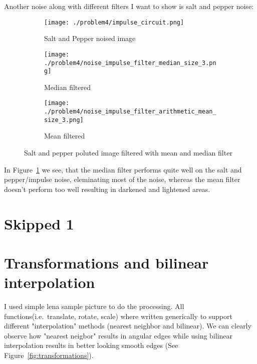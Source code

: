 \documentclass[a4paper]{scrartcl}
\begin{document}
Another noise along with different filters I want to show is salt and pepper noise:
\begin{figure}[H]
  \centering
  \begin{subfigure}[t]{0.4\textwidth}
    \texttt{[image: ./problem4/impulse\_circuit.png]}
    \caption{Salt and Pepper noised image}
  \end{subfigure}
  \begin{subfigure}[t]{0.4\textwidth}
    \texttt{[image: ./problem4/noise\_impulse\_filter\_median\_size\_3.png]}
    \caption{Median filtered}
  \end{subfigure}
  \begin{subfigure}[t]{0.4\textwidth}
    \texttt{[image: ./problem4/noise\_impulse\_filter\_arithmetic\_mean\_size\_3.png]}
    \caption{Mean filtered}
  \end{subfigure}
  \caption{Salt and pepper poluted image filtered with mean and median filter}
  \label{fig:circuitsaltpepper}
\end{figure}

In Figure~\ref{fig:circuitsaltpepper} we see, that the median filter performs quite well on the salt and pepper/impulse noise, eleminating most of the noise, whereas the mean filter doesn't perform too well resulting in darkened and lightened areas.



\section{Skipped 1}

\section{Transformations and bilinear interpolation}

I used simple lena sample picture to do the processing. All functions(i.e.\ translate, rotate, scale) where written generically to support different "interpolation" methods (nearest neighbor and bilinear). We can clearly observe how "nearest neigbor" results in angular edges while using bilinear interpolation results in better looking smooth edges (See Figure~\ref{fig:transformations}).
\end{document}
